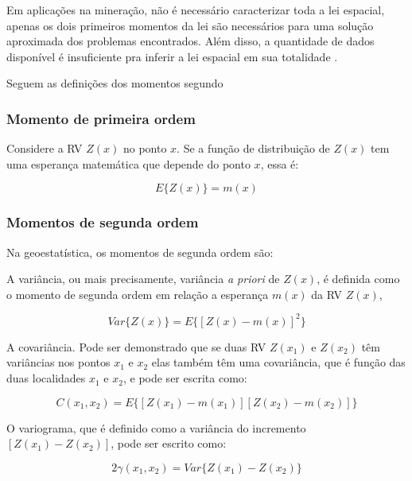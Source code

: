 Em aplicações na mineração, não é necessário caracterizar toda a lei espacial, apenas os dois primeiros momentos da lei são necessários para uma solução aproximada dos problemas encontrados. Além disso, a quantidade de dados disponível é insuficiente pra inferir a lei espacial em sua totalidade \cite{journel1978mining}.
			
Seguem as definições dos momentos segundo 
			
\subsubsection{Momento de primeira ordem}
				
Considere a RV $Z(x)$ no ponto $x$. Se a função de distribuição de $Z(x)$ tem uma esperança matemática que depende do ponto $x$, essa é:
				
\begin{equation}
	E\{Z(x)\}=m(x)
\end{equation}
                
\subsubsection{Momentos de segunda ordem}
			
Na geoestatística, os momentos de segunda ordem são:
				

A variância, ou mais precisamente, variância \textit{a priori} de $Z(x)$, é definida como o momento de segunda ordem em relação a esperança $m(x)$ da RV $Z(x)$,

\begin{equation}
	Var\{Z(x)\}=E\{[Z(x)-m(x)]^2\}
\end{equation}	

A covariância. Pode ser demonstrado que se duas RV $Z(x_1)$ e $Z(x_2)$ têm variâncias nos pontos $x_1$ e $x_2$ elas também têm uma covariância, que é função das duas localidades $x_1$ e $x_2$, e pode ser escrita como:
				
\begin{equation}
	C(x_1,x_2)=E\{[Z(x_1)-m(x_1)][Z(x_2)-m(x_2)]\}
\end{equation}

O variograma, que é definido como a variância do incremento $[Z(x_1)-Z(x_2)]$, pode ser escrito como:
				
\begin{equation}
	2\gamma(x_1,x_2)=Var\{Z(x_1)-Z(x_2)\}
\end{equation}
				
